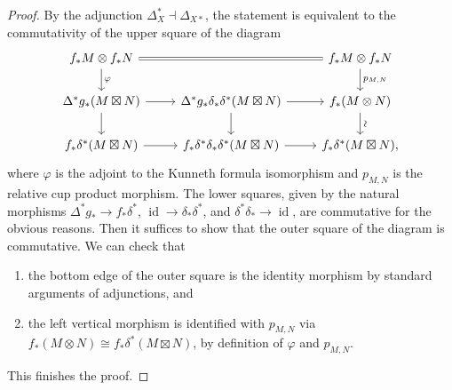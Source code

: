 \documentclass{amsart}
\numberwithin{equation}{section}
\theoremstyle{plain}
\theoremstyle{definition}
\DeclareMathOperator{\id}{\mathrm{id}}
\begin{document}
\begin{proof}
    By the adjunction $\Delta_X^* \dashv \Delta_{X*}$,
    the statement is equivalent to the commutativity of the upper square of the diagram
    \[
        \begin{tikzcd}
            f_*M \otimes f_*N \arrow[rr, equal]\arrow[d, "\varphi"]&&f_*M \otimes f_*N\arrow[d, "p_{M, N}"]\\
            \Delta^*g_*(M \boxtimes N) \arrow[r]\dar&\Delta^*g_*\delta_*\delta^*(M \boxtimes N) \arrow[r]\dar&f_*(M \otimes N)\dar["\sim", sloped]\\
            f_*\delta^*(M \boxtimes N) \rar & f_*\delta^*\delta_*\delta^*(M\boxtimes N) \rar & f_*\delta^*(M \boxtimes N),
        \end{tikzcd}
    \]
    where $\varphi$ is the adjoint to the Kunneth formula isomorphism and $p_{M, N}$ is the relative cup product morphism.
    The lower squares, given by the natural morphisms $\Delta^*g_* \to f_*\delta^*$,
    $\id \to \delta_*\delta^*$,
    and $\delta^*\delta_* \to \id$, are commutative for the obvious reasons.
    Then it suffices to show that the outer square of the diagram is commutative.
    We can check that
    \begin{enumerate}
        \item the bottom edge of the outer square is the identity morphism by standard arguments of adjunctions, and
        \item the left vertical morphism is identified with $p_{M, N}$ via $f_*(M \otimes N) \cong f_*\delta^*(M \boxtimes N)$, by definition of $\varphi$ and $p_{M, N}$.
    \end{enumerate}
    This finishes the proof.
\end{proof}
\end{document}
